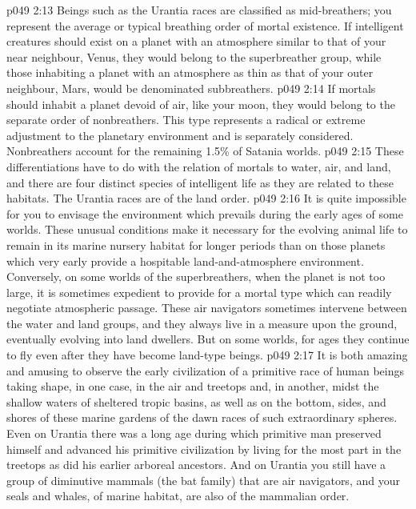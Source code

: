 \vs p049 2:13 Beings such as the Urantia races are classified as mid\hyp{}breathers; you represent the average or typical breathing order of mortal existence. If intelligent creatures should exist on a planet with an atmosphere similar to that of your near neighbour, Venus, they would belong to the superbreather group, while those inhabiting a planet with an atmosphere as thin as that of your outer neighbour, Mars, would be denominated subbreathers.
\vs p049 2:14 If mortals should inhabit a planet devoid of air, like your moon, they would belong to the separate order of nonbreathers. This type represents a radical or extreme adjustment to the planetary environment and is separately considered. Nonbreathers account for the remaining 1.5\% of Satania worlds.
\vs p049 2:15 \bibnobreakspace {} These differentiations have to do with the relation of mortals to water, air, and land, and there are four distinct species of intelligent life as they are related to these habitats. The Urantia races are of the land order.
\vs p049 2:16 It is quite impossible for you to envisage the environment which prevails during the early ages of some worlds. These unusual conditions make it necessary for the evolving animal life to remain in its marine nursery habitat for longer periods than on those planets which very early provide a hospitable land\hyp{}and\hyp{}atmosphere environment. Conversely, on some worlds of the superbreathers, when the planet is not too large, it is sometimes expedient to provide for a mortal type which can readily negotiate atmospheric passage. These air navigators sometimes intervene between the water and land groups, and they always live in a measure upon the ground, eventually evolving into land dwellers. But on some worlds, for ages they continue to fly even after they have become land\hyp{}type beings.
\vs p049 2:17 It is both amazing and amusing to observe the early civilization of a primitive race of human beings taking shape, in one case, in the air and treetops and, in another, midst the shallow waters of sheltered tropic basins, as well as on the bottom, sides, and shores of these marine gardens of the dawn races of such extraordinary spheres. Even on Urantia there was a long age during which primitive man preserved himself and advanced his primitive civilization by living for the most part in the treetops as did his earlier arboreal ancestors. And on Urantia you still have a group of diminutive mammals (the bat family) that are air navigators, and your seals and whales, of marine habitat, are also of the mammalian order.
